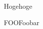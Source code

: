\documentclass{article}
\begin{document}
\begin{screen}[0]Hogehoge\end{screen}
\begin{itembox}{FOO}Foobar\end{itembox}
\end{document}
